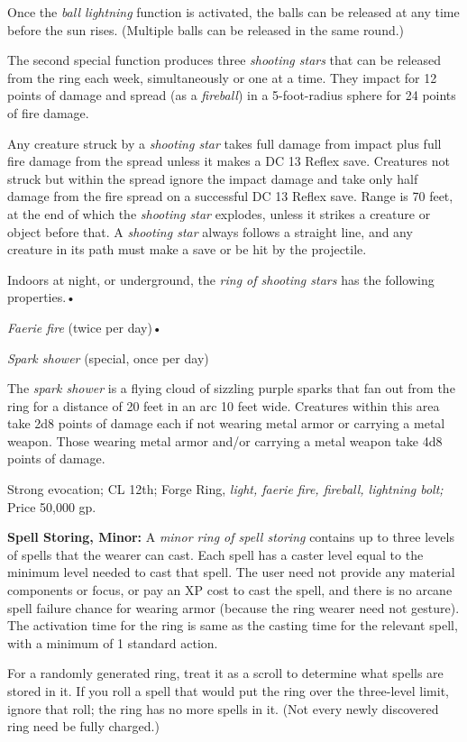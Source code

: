 Once the \textit{ball lightning }function is activated, the balls can be released 
at any time before the sun rises. (Multiple balls can be released in the same round.)

The second special function produces three \textit{shooting stars }that can be 
released from the ring each week, simultaneously or one at a time. They impact 
for 12 points of damage and spread (as a \textit{fireball}) in a 5-foot-radius 
sphere for 24 points of fire damage.

Any creature struck by a \textit{shooting star }takes full damage from impact plus 
full fire damage from the spread unless it makes a DC 13 Reflex save. Creatures 
not struck but within the spread ignore the impact damage and take only half damage 
from the fire spread on a successful DC 13 Reflex save. Range is 70 feet, at the 
end of which the \textit{shooting star }explodes, unless it strikes a creature 
or object before that. A \textit{shooting star }always follows a straight line, 
and any creature in its path must make a save or be hit by the projectile.

Indoors at night, or underground, the \textit{ring of shooting stars }has the following 
properties.•

\textit{Faerie fire }(twice per day)•

\textit{Spark shower }(special, once per day)

The \textit{spark shower }is a flying cloud of sizzling purple sparks that fan 
out from the ring for a distance of 20 feet in an arc 10 feet wide. Creatures within 
this area take 2d8 points of damage each if not wearing metal armor or carrying 
a metal weapon. Those wearing metal armor and/or carrying a metal weapon take 4d8 
points of damage.

Strong evocation; CL 12th; Forge Ring, \textit{light, faerie fire, fireball, lightning 
bolt; }Price 50,000 gp.

\textbf{Spell Storing, Minor:} A \textit{minor ring of spell storing }contains 
up to three levels of spells that the wearer can cast. Each spell has a caster 
level equal to the minimum level needed to cast that spell. The user need not provide 
any material components or focus, or pay an XP cost to cast the spell, and there 
is no arcane spell failure chance for wearing armor (because the ring wearer need 
not gesture). The activation time for the ring is same as the casting time for 
the relevant spell, with a minimum of 1 standard action.

For a randomly generated ring, treat it as a scroll to determine what spells are 
stored in it. If you roll a spell that would put the ring over the three-level 
limit, ignore that roll; the ring has no more spells in it. (Not every newly discovered 
ring need be fully charged.)

